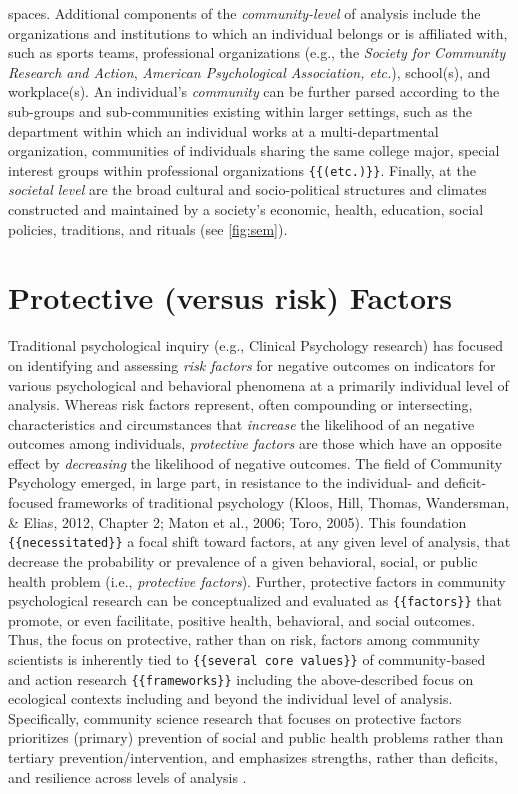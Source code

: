 \documentclass[11pt,]{tufte-book}
\begin{document}
spaces. Additional components of the \emph{community-level} of analysis
include the organizations and institutions to which an individual
belongs or is affiliated with, such as sports teams, professional
organizations (e.g., the \emph{Society for Community Research and
Action}, \emph{American Psychological Association, etc.}), school(s),
and workplace(s). An individual's \emph{community} can be further parsed
according to the sub-groups and sub-communities existing within larger
settings, such as the department within which an individual works at a
multi-departmental organization, communities of individuals sharing the
same college major, special interest groups within professional
organizations \texttt{\{\{(etc.)\}\}}. Finally, at the \emph{societal
level} are the broad cultural and socio-political structures and
climates constructed and maintained by a society's economic, health,
education, social policies, traditions, and rituals (see
\cref{fig:sem}).

\section{Protective (versus risk)
Factors}\label{protective-versus-risk-factors}

Traditional psychological inquiry (e.g., Clinical Psychology research)
has focused on identifying and assessing \emph{risk factors} for
negative outcomes on indicators for various psychological and behavioral
phenomena at a primarily individual level of analysis. Whereas risk
factors represent, often compounding or intersecting, characteristics
and circumstances that \emph{increase} the likelihood of an negative
outcomes among individuals, \emph{protective factors} are those which
have an opposite effect by \emph{decreasing} the likelihood of negative
outcomes. The field of Community Psychology emerged, in large part, in
resistance to the individual- and deficit-focused frameworks of
traditional psychology (Kloos, Hill, Thomas, Wandersman, \& Elias, 2012,
Chapter 2; Maton et al., 2006; Toro, 2005). This foundation
\texttt{\{\{necessitated\}\}} a focal shift toward factors, at any given
level of analysis, that decrease the probability or prevalence of a
given behavioral, social, or public health problem (i.e.,
\emph{protective factors}). Further, protective factors in community
psychological research can be conceptualized and evaluated as
\texttt{\{\{factors\}\}} that promote, or even facilitate, positive
health, behavioral, and social outcomes. Thus, the focus on protective,
rather than on risk, factors among community scientists is inherently
tied to \texttt{\{\{several\ core\ values\}\}} of community-based and
action research \texttt{\{\{frameworks\}\}} including the
above-described focus on ecological contexts including and beyond the
individual level of analysis. Specifically, community science research
that focuses on protective factors prioritizes (primary) prevention of
social and public health problems rather than tertiary
prevention/intervention, and emphasizes strengths, rather than deficits,
and resilience across levels of analysis .
\end{document}
